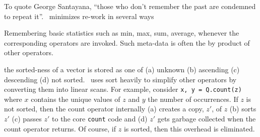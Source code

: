 To quote George Santayana, ``those who don't remember the past are condemned to
repeat it''.  \Q\ minimizes re-work in several ways
\be
\item 
Remembering basic statistics such as min, max, sum, average, whenever the
corresponding operators are invoked. 
Such meta-data is often the by product of other operators.
\item the sorted-ness of a vector is
stored as one of (a) unknown (b) ascending (c) descending (d) not sorted. 
\Q\
uses sort heavily to simplify other operators by converting them into linear
scans. For example, consider {\tt x, y  = Q.count(z)} where \(x\) contains the
unique values of \(z\) and \(y\) the number of occurrences. If \(z\) is not
sorted, then the count operator internally (a) creates a copy, \(z'\), of \(z\)
(b) sorts \(z'\) (c) passes \(z'\) to the core {\tt count} code and (d) \(z'\) gets
garbage collected when the count operator returns. Of course, if \(z\) is
sorted, then this overhead is eliminated.

\ee

